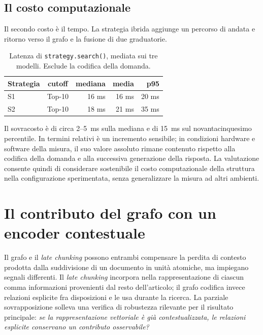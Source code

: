 \subsection{Il costo computazionale}

Il secondo costo è il tempo. La strategia ibrida aggiunge un percorso di andata e ritorno verso il grafo e la fusione di due graduatorie.

\begin{table}[H]
    \centering
    \renewcommand{\arraystretch}{1.2}
    \begin{tabular}{|l|c|r|r|r|}
        \hline
        \textbf{Strategia} & \textbf{cutoff} & \textbf{mediana} & \textbf{media} & \textbf{p95} \\
        \hline
        S1 & Top-10 & 16 ms & 16 ms & 20 ms \\
        S2 & Top-10 & 18 ms & 21 ms & 35 ms \\
        \hline
    \end{tabular}
    \caption{Latenza di \texttt{strategy.search()}, mediata sui tre modelli. Esclude la codifica della domanda.}
    \label{tab:latenza}
\end{table}

Il sovracosto è di circa 2--5~ms sulla mediana e di 15~ms sul novantacinquesimo percentile. In termini relativi è un incremento sensibile; in condizioni hardware e software della misura, il suo valore assoluto rimane contenuto rispetto alla codifica della domanda e alla successiva generazione della risposta. La valutazione consente quindi di considerare sostenibile il costo computazionale della struttura nella configurazione sperimentata, senza generalizzare la misura ad altri ambienti.

\section{Il contributo del grafo con un encoder contestuale}
\label{sec:antitesi}

Il grafo e il \textit{late chunking} possono entrambi compensare la perdita di contesto prodotta dalla suddivisione di un documento in unità atomiche, ma impiegano segnali differenti. Il \textit{late chunking} incorpora nella rappresentazione di ciascun comma informazioni provenienti dal resto dell'articolo; il grafo codifica invece relazioni esplicite fra disposizioni e le usa durante la ricerca. La parziale sovrapposizione solleva una verifica di robustezza rilevante per il risultato principale: \textit{se la rappresentazione vettoriale è già contestualizzata, le relazioni esplicite conservano un contributo osservabile?}


